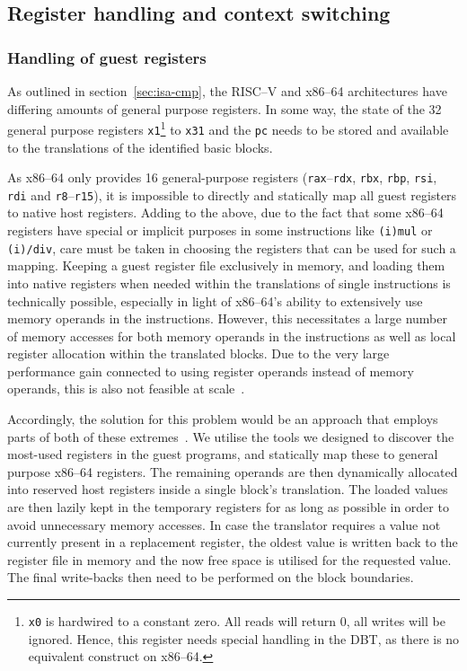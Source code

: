 \subsection{Register handling and context switching}
\label{sec:context-switch-reg-handle}
\subsubsection{Handling of guest registers}
\label{sec:reg-handle}
As outlined in section~\ref{sec:isa-cmp}, the RISC--V and x86--64 architectures have differing amounts of general purpose registers.
In some way, the state of the 32 general purpose registers \texttt{x1}\footnote{\texttt{x0} is hardwired to a constant zero. All reads will return 0, all writes will be ignored. Hence, this register needs special handling in the DBT, as there is no equivalent construct on x86--64.} to \texttt{x31} and the \texttt{pc} needs to be stored and available to the translations of the identified basic blocks.

As x86--64 only provides 16 general-purpose registers (\texttt{rax}--\texttt{rdx}, \texttt{rbx}, \texttt{rbp}, \texttt{rsi}, \texttt{rdi} and \texttt{r8}--\texttt{r15}), it is impossible to directly and statically map all guest registers to native host registers.
Adding to the above, due to the fact that some x86--64 registers have special or implicit purposes in some instructions like \texttt{(i)mul} or \texttt{(i)/div}, care must be taken in choosing the registers that can be used for such a mapping.
Keeping a guest register file exclusively in memory, and loading them into native registers when needed within the translations of single instructions is technically possible, especially in light of x86--64's ability to extensively use memory operands in the instructions.
However, this necessitates a large number of memory accesses for both memory operands in the instructions as well as local register allocation within the translated blocks.
Due to the very large performance gain connected to using register operands instead of memory operands, this is also not feasible at scale~\cite[S. 8f.]{bintrans}.

Accordingly, the solution for this problem would be an approach that employs parts of both of these extremes~\cite[S. 9]{bintrans}.
We utilise the tools we designed to discover the most-used registers in the guest programs, and statically map these to general purpose x86--64 registers.
The remaining operands are then dynamically allocated into reserved host registers inside a single block's translation.
The loaded values are then lazily kept in the temporary registers for as long as possible in order to avoid unnecessary memory accesses.
In case the translator requires a value not currently present in a replacement register, the oldest value is written back to the register file in memory and the now free space is utilised for the requested value.
The final write-backs then need to be performed on the block boundaries.

